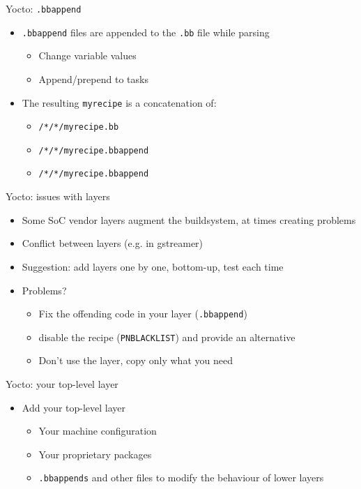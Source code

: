 \documentclass[xetex,table,aspectratio=169]{beamer}
\begin{document}
\begin{frame}{Yocto: {\tt .bbappend}}
  \begin{itemize}
  \item {\tt .bbappend} files are appended to the {\tt .bb} file while
    parsing
    \begin{itemize}
    \item Change variable values
    \item Append/prepend to tasks
    \end{itemize}
  \item The resulting {\tt myrecipe} is a concatenation of:
    \begin{itemize}
    \item {\tt <LAYER1>/*/*/myrecipe.bb}
    \item {\tt <LAYER2>/*/*/myrecipe.bbappend}
    \item {\tt <LAYER3>/*/*/myrecipe.bbappend}
    \end{itemize}
  \end{itemize}
\end{frame}

\begin{frame}[fragile]{Yocto: issues with layers}
  \begin{itemize}
  \item Some SoC vendor layers augment the buildsystem, at times
    creating problems
  \item Conflict between layers (e.g. in gstreamer)
  \item Suggestion: add layers one by one, bottom-up, test each time
  \item Problems?
    \begin{itemize}
    \item Fix the offending code in your layer ({\tt .bbappend})
    \item disable the recipe ({\tt PNBLACKLIST}) and provide an alternative
    \item Don't use the layer, copy only what you need
    \end{itemize}
  \end{itemize}
\end{frame}

\begin{frame}[fragile]{Yocto: your top-level layer}
  \begin{itemize}
  \item Add your top-level layer
    \begin{itemize}
    \item Your machine configuration
    \item Your proprietary packages
    \item {\tt .bbappends} and other files to modify the behaviour of
      lower layers
    \end{itemize}
\end{itemize}
\end{frame}
\end{document}
